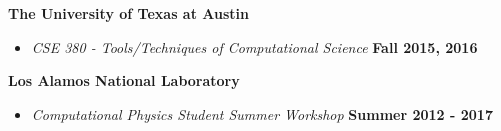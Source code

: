 
\textbf{The University of Texas at Austin}
  \begin{itemize}
    \item[] \textit{CSE 380 - Tools/Techniques of Computational Science}%
    \hfill \textbf{Fall 2015, 2016}
    \end{itemize}


\textbf{Los Alamos National Laboratory}
  \begin{itemize}
    \item[] \textit{Computational Physics Student Summer Workshop}%
    \hfill \textbf{Summer 2012 - 2017}
    \end{itemize}
